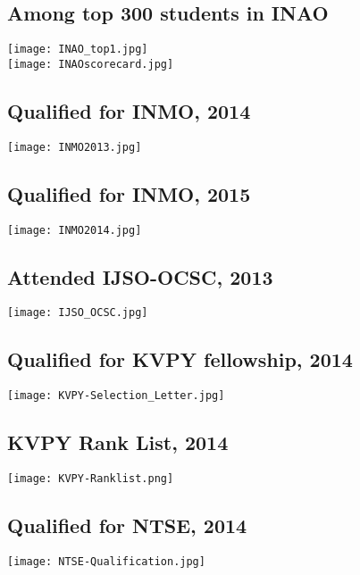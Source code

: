 \documentclass{article}
\begin{document}
	\subsection{Among top 300 students in INAO }
\begin{center}
	\texttt{[image: INAO\_top1.jpg]}{\centering}\\
	\texttt{[image: INAOscorecard.jpg]}{\centering}
\end{center}
	\subsection{Qualified for INMO, 2014}
\begin{center}
	\texttt{[image: INMO2013.jpg]}{\centering}
\end{center}
	\subsection{Qualified for INMO, 2015}
\begin{center}
	\texttt{[image: INMO2014.jpg]}{\centering}
\end{center}
	\subsection{Attended IJSO-OCSC, 2013}
\begin{center}
	\texttt{[image: IJSO\_OCSC.jpg]}{\centering}
\end{center}
	\subsection{Qualified for KVPY fellowship, 2014}
\begin{center}
	\texttt{[image: KVPY-Selection\_Letter.jpg]}{\centering}
\end{center}
	\subsection{KVPY Rank List, 2014}
\begin{center}
	\texttt{[image: KVPY-Ranklist.png]}{\centering}
\end{center}
	\subsection{Qualified for NTSE, 2014}
\begin{center}
	\texttt{[image: NTSE-Qualification.jpg]}{\centering}
\end{center}
\end{document}
